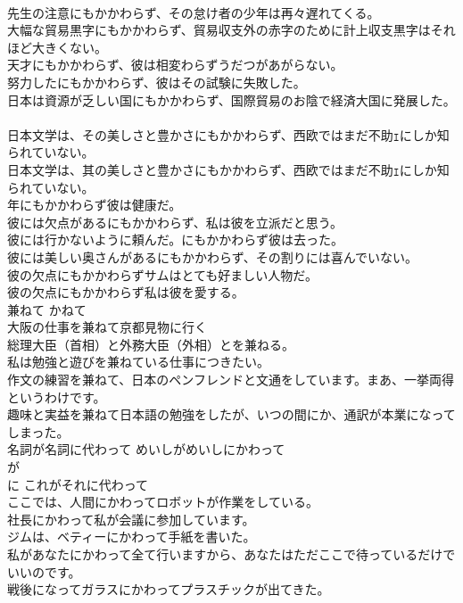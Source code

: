 \documentclass[8pt]{extreport}
\begin{document}
\begin{CJK}{UTF8}{min}
\\	先生の注意にもかかわらず、その怠け者の少年は再々遅れてくる。   
\\	大幅な貿易黒字にもかかわらず、貿易収支外の赤字のために計上収支黒字はそれほど大きくない。   
\\	天才にもかかわらず、彼は相変わらずうだつがあがらない。   
\\	努力したにもかかわらず、彼はその試験に失敗した。   
\\	日本は資源が乏しい国にもかかわらず、国際貿易のお陰で経済大国に発展した。   
\\	日本文学は、その美しさと豊かさにもかかわらず、西欧ではまだ不助ｪにしか知られていない。   
\\	日本文学は、其の美しさと豊かさにもかかわらず、西欧ではまだ不助ｪにしか知られていない。   
\\	年にもかかわらず彼は健康だ。   
\\	彼には欠点があるにもかかわらず、私は彼を立派だと思う。   
\\	彼には行かないように頼んだ。にもかかわらず彼は去った。   
\\	彼には美しい奥さんがあるにもかかわらず、その割りには喜んでいない。   
\\	彼の欠点にもかかわらずサムはとても好ましい人物だ。   
\\	彼の欠点にもかかわらず私は彼を愛する。   
\\	兼ねて	かねて	
\\	大阪の仕事を兼ねて京都見物に行く  
\\	総理大臣（首相）と外務大臣（外相）とを兼ねる。  
\\	私は勉強と遊びを兼ねている仕事につきたい。   
\\	作文の練習を兼ねて、日本のペンフレンドと文通をしています。まあ、一挙両得というわけです。  
\\	趣味と実益を兼ねて日本語の勉強をしたが、いつの間にか、通訳が本業になってしまった。  
\\	名詞が名詞に代わって	めいしがめいしにかわって	
\\	が 
\\	に これがそれに代わって	
\\	ここでは、人間にかわってロボットが作業をしている。  
\\	社長にかわって私が会議に参加しています。   
\\	ジムは、ベティーにかわって手紙を書いた。  
\\	私があなたにかわって全て行いますから、あなたはただここで待っているだけでいいのです。  
\\	戦後になってガラスにかわってプラスチックが出てきた。  

\end{CJK}
\end{document}
